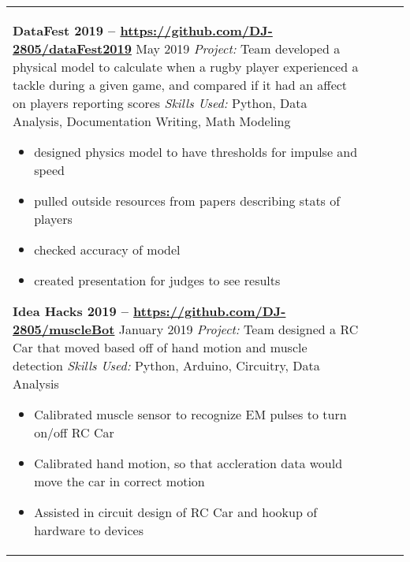 \documentclass[10pt]{article}
\newcommand*\leftright[2]{%
  \leavevmode
  \rlap{#1}%
  \hspace{0.5\linewidth}%
  #2}
\begin{document}
\begin{longtable}{l l l l}
{        \textbf{DataFest 2019 -- \href{https://github.com/DJ-2805/dataFest2019}{https://github.com/DJ-2805/dataFest2019}} \newline
        \leftright{\textit{Title:} Data Analyst}{May 2019}  \newline
        \textit{Project:} Team developed a physical model to calculate when a rugby player experienced a tackle during a given game, and compared if it had an affect on players reporting scores \newline
        \textit{Skills Used:} Python, Data Analysis, Documentation Writing, Math Modeling
        \begin{itemize}[noitemsep,nolistsep]
            \item designed physics model to have thresholds for impulse and speed
            \item pulled outside resources from papers describing stats of players
            \item checked accuracy of model
            \item created presentation for judges to see results
        \end{itemize}
        
        \textbf{Idea Hacks 2019 -- \href{https://github.com/DJ-2805/muscleBot}{https://github.com/DJ-2805/muscleBot}} \newline
        \leftright{\textit{Title:} Data Analyst}{January 2019} \newline
        \textit{Project:} Team designed a RC Car that moved based off of hand motion and muscle detection \newline
        \textit{Skills Used:} Python, Arduino, Circuitry, Data Analysis
        \begin{itemize}[noitemsep,nolistsep]
            \item Calibrated muscle sensor to recognize EM pulses to turn on/off RC Car
            \item Calibrated hand motion, so that accleration data would move the car in correct motion
            \item Assisted in circuit design of RC Car and hookup of hardware to devices
        \end{itemize}
        
}
\end{longtable}
\end{document}
